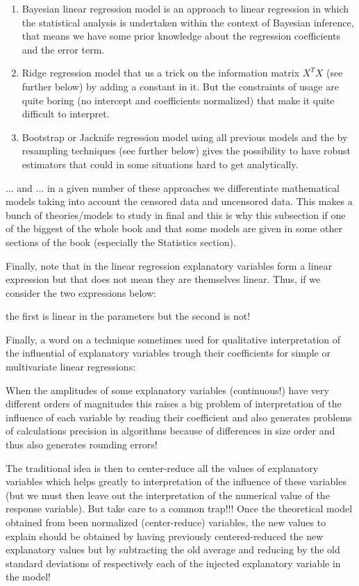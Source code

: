 \begin{enumerate}
		\item Bayesian linear regression model is an approach to linear regression in which the statistical analysis is undertaken within the context of Bayesian inference, that means we have some prior knowledge about the regression coefficients and the error term.
		
		\item Ridge regression model that us a trick on the information matrix $X^TX$ (see further below) by adding a constant in it. But the constraints of usage are quite boring (no intercept and coefficients normalized) that make it quite difficult to interpret.
		
		\item Bootstrap or Jacknife regression model using all previous models and the by resampling techniques (see further below) gives the possibility to have robust estimators that could in some situations hard to get analytically. 
	\end{enumerate}
	... and ... in a given number of these approaches we differentiate mathematical models taking into account the censored data and uncensored data. This makes a bunch of theories/models to study in final and this is why this subsection if one of the biggest of the whole book and that some models are given in some other sections of the book (especially the Statistics section).
	
	Finally, note that in the linear regression explanatory variables form a linear expression but that does not mean they are themselves linear. Thus, if we consider the two expressions below:
	
	the first is linear in the parameters but the second is not!
	
	Finally, a word on a technique sometimes used for qualitative interpretation of the influential of explanatory variables trough their coefficients for simple or multivariate linear regressions:
	
	When the amplitudes of some explanatory variables (continuous!) have very different orders of magnitudes this raises a big problem of interpretation of the influence of each variable by reading their coefficient and also generates problems of calculations precision in algorithms because of differences in size order and thus also generates rounding errors!
	
	The traditional idea is then to center-reduce all the values of explanatory variables which helps greatly to interpretation of the influence of these variables (but we must then leave out the interpretation of the numerical value of the response variable). But take care to a common trap!!! Once the theoretical model obtained from been normalized (center-reduce) variables, the new values to explain should be obtained by having previously centered-reduced the new explanatory values but by subtracting the old average and reducing by the old standard deviations of respectively each of the injected explanatory variable in the model!
	
